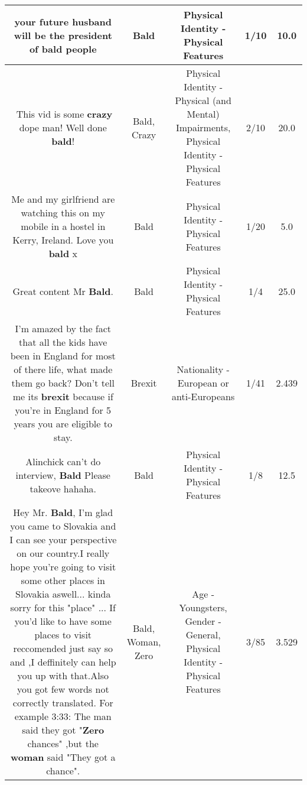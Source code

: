 \documentclass[11pt]{article}
\newlength\mylength
\begin{document}
\begin{center}
\begin{longtable}{|C{.65\mylength}|C{.30\mylength}|C{.12\mylength}|C{.12\mylength}|C{.12\mylength}|}
  \small your future husband will be the president of \textbf{bald} people\normalsize   & Bald & Physical Identity - Physical Features & 1/10 & 10.0 \\  \hline
  \small 🍁This vid is some \textbf{crazy} dope man! Well done \textbf{bald}!\normalsize   & Bald, Crazy & Physical Identity - Physical (and Mental) Impairments, Physical Identity - Physical Features & 2/10 & 20.0 \\  \hline
  \small Me and my girlfriend are watching this on my mobile in a hostel in Kerry, Ireland. Love you \textbf{bald} x\normalsize   & Bald & Physical Identity - Physical Features & 1/20 & 5.0 \\  \hline
  \small Great content Mr \textbf{Bald}.\normalsize   & Bald & Physical Identity - Physical Features & 1/4 & 25.0 \\  \hline
  \small I'm amazed by the fact that all the kids have been in England for most of there life, what made them go back? Don't tell me its \textbf{brexit} because if you're in England for 5 years you are eligible to stay.\normalsize   & Brexit & Nationality - European or anti-Europeans & 1/41 & 2.439 \\  \hline
  \small Alinchick can't do interview, \textbf{Bald} Please takeove hahaha.\normalsize   & Bald & Physical Identity - Physical Features & 1/8 & 12.5 \\  \hline
  \small Hey Mr. \textbf{Bald}, I'm glad you came to Slovakia and I can see your perspective on our country.I really hope you're going to visit some other places in Slovakia aswell... kinda sorry for this "place" ... If you'd like to have some places to visit reccomended just say so and ,I deffinitely can help you up with that.Also you got few words not correctly translated. For example  3:33: The man said they got "\textbf{Zero} chances" ,but the \textbf{woman} said "They got a chance".\normalsize   & Bald, Woman, Zero & Age - Youngsters, Gender - General, Physical Identity - Physical Features & 3/85 & 3.529 \\  \hline

\end{longtable}
\end{center}
\end{document}

